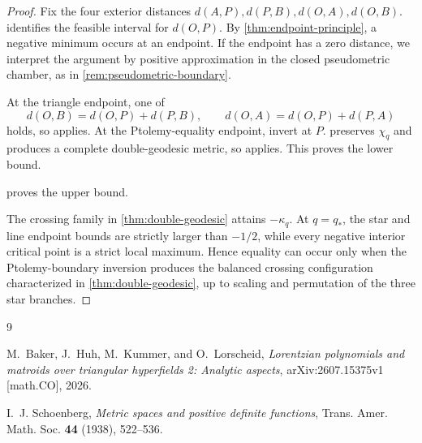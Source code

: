 \documentclass[11pt]{amsart}
\theoremstyle{definition}
\theoremstyle{remark}
\newcommand{\qstar}{q_*}
\begin{document}
\begin{proof}
Fix the four exterior distances \(d(A,P),d(P,B),d(O,A),d(O,B)\).  identifies the feasible interval for \(d(O,P)\). By \cref{thm:endpoint-principle}, a negative minimum occurs at an endpoint. If the endpoint has a zero distance, we interpret the argument by positive approximation in the closed pseudometric chamber, as in \cref{rem:pseudometric-boundary}.

At the triangle endpoint, one of
\[
 d(O,B)=d(O,P)+d(P,B),
 \qquad
 d(O,A)=d(O,P)+d(P,A)
\]
holds, so  applies. At the Ptolemy-equality endpoint, invert at \(P\).  preserves \(\chi_q\) and produces a complete double-geodesic metric, so  applies. This proves the lower bound.

 proves the upper bound.

The crossing family in \cref{thm:double-geodesic} attains \(-\kappa_q\). At \(q=\qstar\), the star and line endpoint bounds are strictly larger than \(-1/2\), while every negative interior critical point is a strict local maximum. Hence equality can occur only when the Ptolemy-boundary inversion produces the balanced crossing configuration characterized in \cref{thm:double-geodesic}, up to scaling and permutation of the three star branches.
\end{proof}



\begin{thebibliography}{9}

M.~Baker, J.~Huh, M.~Kummer, and O.~Lorscheid,
\emph{Lorentzian polynomials and matroids over triangular hyperfields 2:
Analytic aspects}, arXiv:2607.15375v1 [math.CO], 2026.

I.~J. Schoenberg,
\emph{Metric spaces and positive definite functions},
Trans. Amer. Math. Soc. \textbf{44} (1938), 522--536.

\end{thebibliography}
\end{document}
